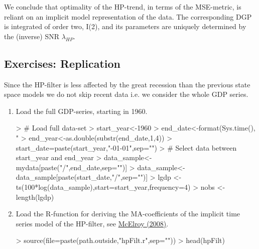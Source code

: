 \documentclass[a4paper]{book}
\begin{document}
We conclude that optimality of the HP-trend, in terms of the MSE-metric, is reliant on an implicit model representation of the data. The corresponding DGP is integrated of order two, I(2), and its parameters are uniquely determined by the (inverse) SNR $\lambda_{HP}$.



\subsection{Exercises: Replication}\label{hp_exe_repli}



Since the HP-filter is less affected by the great recession than the previous state space models we do not skip recent data i.e. we consider the whole GDP series. 
\begin{enumerate}
\item Load the full GDP-series, starting in 1960.
\begin{Schunk}
\begin{Sinput}
> # Load full data-set
> start_year<-1960
> end_date<-format(Sys.time(), "%
> end_year<-as.double(substr(end_date,1,4))
> start_date=paste(start_year,"-01-01",sep="")
> # Select data between start_year and end_year
> data_sample<-mydata[paste("/",end_date,sep="")]
> data_sample<-data_sample[paste(start_date,"/",sep="")]
> lgdp <- ts(100*log(data_sample),start=start_year,frequency=4)
> nobs <- length(lgdp)
\end{Sinput}
\end{Schunk}
\item Load the R-function for deriving the MA-coefficients of the implicit time series model of the HP-filter, see \href{https://www.dropbox.com/s/s8zb0buqzygefby/mcelroy_hp.pdf?dl=0}{McElroy (2008)}.
\begin{Schunk}
\begin{Sinput}
> source(file=paste(path.outside,"hpFilt.r",sep=""))
> head(hpFilt)
\end{Sinput}
\begin{Soutput}
1 function (q, n)                                                  
2 {                                                                
3     absZ <- (sqrt(q) + sqrt(q + 16) + sqrt(2 * q + 2 * sqrt(q) * 
4         sqrt(q + 16)))/4                                         
5     c <- q/(absZ^2)                                              
6     theta <- atan(sqrt(2 * q + 2 * sqrt(q) * sqrt(q + 16))/4)    
\end{Soutput}
\end{Schunk}

\end{enumerate}
\end{document}
